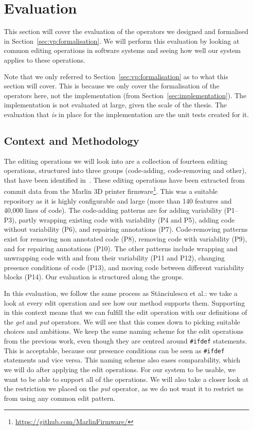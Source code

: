 \chapter{Evaluation}\label{sec:evaluation}
This section will cover the evaluation of the operators we designed and
formalised in Section~\ref{sec:vp:formalisation}. We will perform this
evaluation by looking at common editing operations in software systems and
seeing how well our system applies to these operations.

Note that we only referred to Section~\ref{sec:vp:formalisation} as to what this
section will cover. This is because we only cover the formalisation of the operators
here, not the implementation (from Section~\ref{sec:implementation}). The implementation
is not evaluated at large, given the scale of the thesis. The evaluation that \emph{is}
in place for the implementation are the unit tests created for it.

\section{Context and Methodology}
The editing operations we will look into are a collection of fourteen editing
operations, structured into three groups (code-adding, code-removing and other), 
that have been identified in~\cite{stuanciulescu2016}. These editing operations
have been extracted from commit data from the Marlin 3D printer firmware\footnote{\url{https://github.com/MarlinFirmware/}}.
This was a suitable repository as it is highly configurable and large (more than 140
features and 40,000 lines of code). The code-adding patterns are for adding variability (P1--P3),
partly wrapping existing code with variability (P4 and P5), adding code without variability (P6), and
repairing annotations (P7). Code-removing patterns exist for removing non annotated code (P8),
removing code with variability (P9), and for repairing annotations (P10). The other patterns 
include wrapping and unwrapping code with and from their variability (P11 and P12), changing
presence conditions of code (P13), and moving code between different variability blocks (P14).
Our evaluation is structured along the groups.

In this evaluation, we follow the same process as St{\u{a}}nciulescu et al.: we
take a look at every edit operation and see how our method supports them. Supporting in this
context means that we can fulfill the edit operation with our definitions of the \emph{get}
and \emph{put} operators. We will see that this comes down to picking suitable choices
and ambitions.
We keep the same naming scheme for the edit operations from the previous work, even
though they are centred around \texttt{\#ifdef} statements. This is acceptable, because
our presence conditions can be seen as \texttt{\#ifdef} statements and vice versa. This naming
scheme also eases comparability, which we will do after applying the edit operations.
For our system to be usable, we
want to be able to support all of the operations. We will also take a closer look 
at the restriction we placed on the \emph{put} operator, as we do not want it to
restrict us from using any common edit pattern. 

